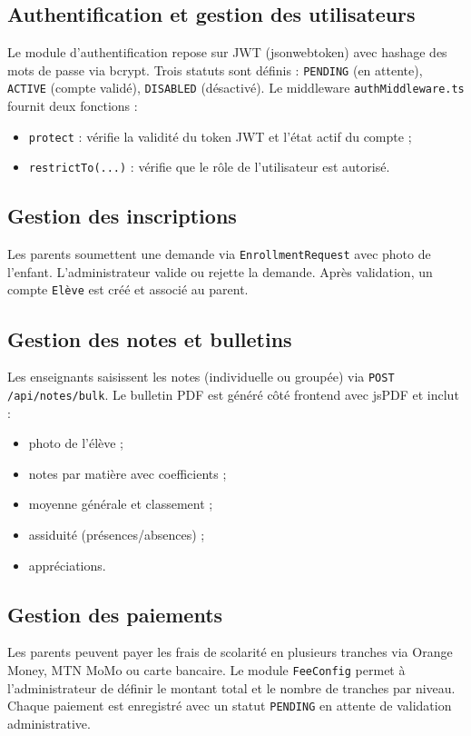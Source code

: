 \documentclass[12pt, a4paper]{report}
\begin{document}
\subsection{Authentification et gestion des utilisateurs}
Le module d'authentification repose sur JWT (jsonwebtoken) avec hashage des mots de passe via bcrypt. Trois statuts sont définis : \texttt{PENDING} (en attente), \texttt{ACTIVE} (compte validé), \texttt{DISABLED} (désactivé). Le middleware \texttt{authMiddleware.ts} fournit deux fonctions :

\begin{itemize}[noitemsep]
    \item \texttt{protect} : vérifie la validité du token JWT et l'état actif du compte ;
    \item \texttt{restrictTo(...)} : vérifie que le rôle de l'utilisateur est autorisé.
\end{itemize}

\subsection{Gestion des inscriptions}
Les parents soumettent une demande via \texttt{EnrollmentRequest} avec photo de l'enfant. L'administrateur valide ou rejette la demande. Après validation, un compte \texttt{Elève} est créé et associé au parent.

\subsection{Gestion des notes et bulletins}
Les enseignants saisissent les notes (individuelle ou groupée) via \texttt{POST /api/notes/bulk}. Le bulletin PDF est généré côté frontend avec jsPDF et inclut :
\begin{itemize}[noitemsep]
    \item photo de l'élève ;
    \item notes par matière avec coefficients ;
    \item moyenne générale et classement ;
    \item assiduité (présences/absences) ;
    \item appréciations.
\end{itemize}

\subsection{Gestion des paiements}
Les parents peuvent payer les frais de scolarité en plusieurs tranches via Orange Money, MTN MoMo ou carte bancaire. Le module \texttt{FeeConfig} permet à l'administrateur de définir le montant total et le nombre de tranches par niveau. Chaque paiement est enregistré avec un statut \texttt{PENDING} en attente de validation administrative.
\end{document}
